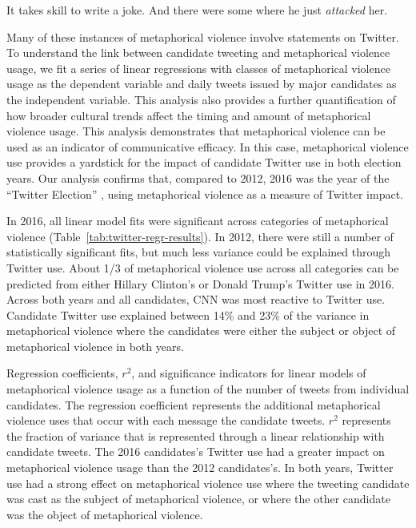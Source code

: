\begin{exe}
  \ex It takes skill to write a joke. And there were some where he just \emph{attacked} her.
\end{exe}

Many of these instances of metaphorical violence involve statements on Twitter. 
To understand the link between candidate tweeting and metaphorical violence usage,
we fit a series of linear regressions with classes of metaphorical violence
usage as the dependent variable and daily tweets issued by major candidates 
as the independent variable.  This analysis also provides a further quantification of how 
broader cultural trends affect the timing and amount of metaphorical violence
usage. This analysis demonstrates that metaphorical violence can be used as an
indicator of communicative efficacy. In this case, metaphorical violence use
provides a yardstick for the
impact of candidate Twitter use in both election years. Our
analysis confirms that, compared to 2012, 2016 was the year of the ``Twitter Election''
\cite{Heller2016}, using metaphorical violence as a measure of Twitter
impact. 

In 2016, all linear model fits were significant across categories of 
metaphorical violence (Table~\ref{tab:twitter-regr-results}). In 2012, there
were still a number of statistically significant fits, but much less variance
could be explained through Twitter use. About 1/3 of metaphorical violence use across all
categories can be predicted from either Hillary Clinton's or Donald Trump's
Twitter use in 2016. Across both years and all candidates, 
CNN was most reactive to Twitter use. Candidate Twitter use explained between
14\% and 23\% of the variance
in metaphorical violence where the candidates were either the subject or object
of metaphorical violence in both years. 

\begin{table}[!h]
  \vspace{.45in}
  \centering
  
  \caption{Regression coefficients, $r^2$, and significance indicators for
    linear models of metaphorical violence usage as a function of the number of
    tweets from individual candidates. The regression
    coefficient represents the additional metaphorical violence uses that 
    occur with each message the candidate tweets. $r^2$ represents the fraction
    of variance that is represented through a linear relationship with candidate
    tweets. The 2016 candidates's Twitter use had a greater impact on metaphorical
    violence usage than the 2012 candidates's. In both years, Twitter use 
    had a strong effect on metaphorical violence use where the tweeting candidate was
    cast as the subject of metaphorical violence, or where the other candidate
    was the object of metaphorical violence.}
  \label{tab:twitter-regr-results}
  \vspace{.25in}
\end{table}

